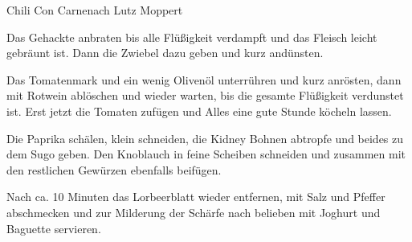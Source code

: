 \begin{recipe}{Chili Con Carne}{nach Lutz Moppert}
  \inglist
  
  \steps
  Das Gehackte anbraten bis alle Flüßigkeit verdampft und das Fleisch leicht gebräunt ist.
  Dann die Zwiebel dazu geben und kurz andünsten. 
  
  Das Tomatenmark und ein wenig Olivenöl unterrühren und kurz anrösten, dann mit Rotwein
  ablöschen und wieder warten, bis die gesamte Flüßigkeit verdunstet ist. Erst jetzt die
  Tomaten zufügen und Alles eine gute Stunde köcheln lassen.
  
  Die Paprika schälen, klein schneiden, die Kidney Bohnen abtropfe und beides zu dem Sugo
  geben. Den Knoblauch in feine Scheiben schneiden und zusammen mit den restlichen
  Gewürzen ebenfalls beifügen. 
  
  Nach ca. 10 Minuten das Lorbeerblatt wieder entfernen, mit Salz und Pfeffer abschmecken
  und zur Milderung der Schärfe nach belieben mit Joghurt und Baguette servieren.
\end{recipe}

